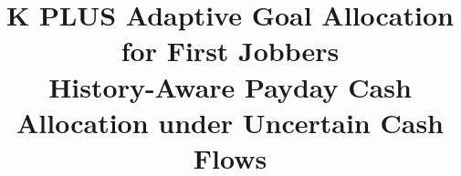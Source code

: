 \documentclass[conference]{IEEEtran}
\begin{document}
\title{K PLUS Adaptive Goal Allocation for First Jobbers\\
{\footnotesize History-Aware Payday Cash Allocation under Uncertain Cash Flows}}

\author{
}

\maketitle












\end{document}
